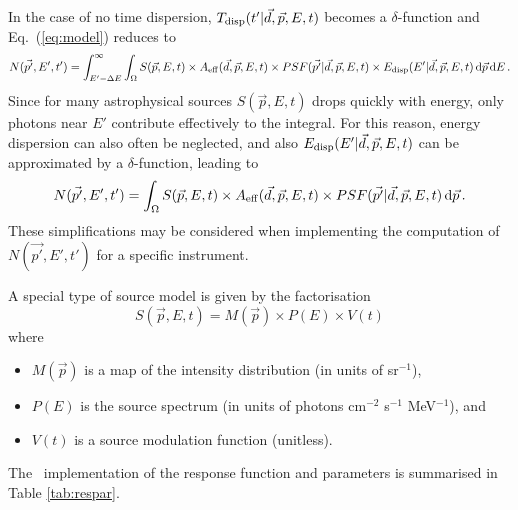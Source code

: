 \documentclass{article}[12pt,a4]
\begin{document}
In the case of no time dispersion, $T_{\rm disp}(t' | \vec{d}, \vec{p}, E, t)$ becomes a $\delta$-function
and Eq.~(\ref{eq:model}) reduces to 
\begin{equation}
N(\vec{p'}, E', t') = \int_{E'-\Delta E}^{\infty} \int_{\Omega} 
S(\vec{p}, E, t) \times A_{\rm eff}(\vec{d}, \vec{p}, E, t) \times
PSF(\vec{p'} | \vec{d}, \vec{p}, E, t) \times
E_{\rm disp}(E' | \vec{d}, \vec{p}, E, t) 
\, {\rm d}\vec{p} \, {\rm d}E \, .
\end{equation}
Since for many astrophysical sources $S(\vec{p}, E, t)$ drops quickly with energy, only
photons near $E'$ contribute effectively to the integral.
For this reason, energy dispersion can also often be neglected, and also
$E_{\rm disp}(E' | \vec{d}, \vec{p}, E, t)$ can be approximated by a $\delta$-function,
leading to
\begin{equation}
N(\vec{p'}, E', t') = \int_{\Omega} S(\vec{p}, E, t) \times A_{\rm eff}(\vec{d}, \vec{p}, E, t) \times
PSF(\vec{p'} | \vec{d}, \vec{p}, E, t) \, {\rm d}\vec{p} \, .
\end{equation}
These simplifications may be considered when implementing the computation of
$N(\vec{p'}, E', t')$ for a specific instrument.

A special type of source model is given by the factorisation
\begin{equation}
S(\vec{p}, E, t) = M(\vec{p}) \times P(E) \times V(t)
\end{equation}
where
\begin{itemize}
\item[] $M(\vec{p})$ is a map of the intensity distribution (in units of sr$^{-1}$),
\item[] $P(E)$ is the source spectrum (in units of photons cm$^{-2}$ s$^{-1}$ MeV$^{-1}$), and
\item[] $V(t)$ is a source modulation function (unitless).
\end{itemize}

The \this\ implementation of the response function and parameters is summarised in 
Table \ref{tab:respar}.
\end{document}
